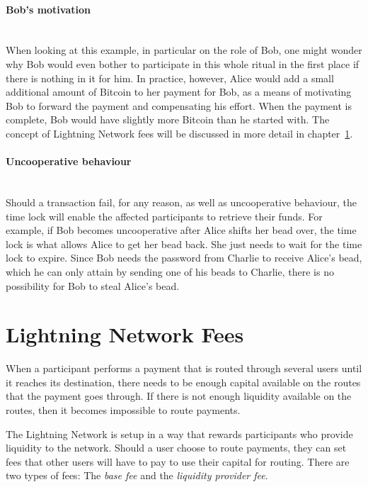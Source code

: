 \documentclass[a4paper, 12pt]{report}
\begin{document}
\paragraph{Bob’s motivation} \hspace{0pt} \\
When looking at this example, in particular on the role of Bob, one might wonder why Bob would even bother to participate in this whole ritual in the first place if there is nothing in it for him. In practice, however, Alice would add a small additional amount of Bitcoin to her payment for Bob, as a means of motivating Bob to forward the payment and compensating his effort. When the payment is complete, Bob would have slightly more Bitcoin than he started with. The concept of Lightning Network fees will be discussed in more detail in chapter~\ref{sec:Lightning_Network_Fees}.

\paragraph{Uncooperative behaviour} \hspace{0pt} \\
Should a transaction fail, for any reason, as well as uncooperative behaviour, the time lock will enable the affected participants to retrieve their funds. For example, if Bob becomes uncooperative after Alice shifts her bead over, the time lock is what allows Alice to get her bead back. She just needs to wait for the time lock to expire. Since Bob needs the password from Charlie to receive Alice’s bead, which he can only attain by sending one of his beads to Charlie, there is no possibility for Bob to steal Alice’s bead.

\section{Lightning Network Fees} \label{sec:Lightning_Network_Fees}

\par When a participant performs a payment that is routed through several users until it reaches its destination, there needs to be enough capital available on the routes that the payment goes through. If there is not enough liquidity available on the routes, then it becomes impossible to route payments.

\par The Lightning Network is setup in a way that rewards participants who provide liquidity to the network. Should a user choose to route payments, they can set fees that other users will have to pay to use their capital for routing.\newline
There are two types of fees: The \textit{base fee} and the \textit{liquidity provider fee}.\cite{chris}
\end{document}
